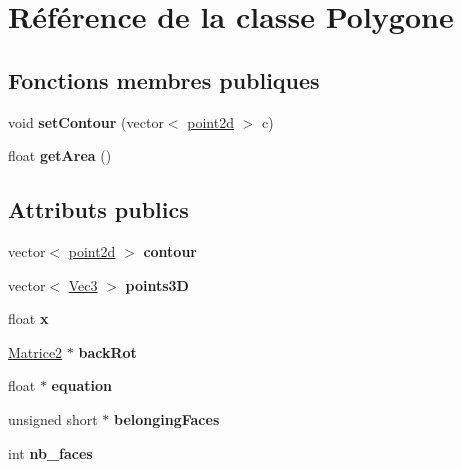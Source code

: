 \hypertarget{class_polygone}{\section{Référence de la classe Polygone}
\label{class_polygone}
}
\subsection*{Fonctions membres publiques}
\begin{DoxyCompactItemize}
\item 
\hypertarget{class_polygone_a3e62cf2566e582fd13f7e8068e81eaf2}{void {\bfseries set\-Contour} (vector$<$ \hyperlink{structpoint2d}{point2d} $>$ c)}\label{class_polygone_a3e62cf2566e582fd13f7e8068e81eaf2}

\item 
\hypertarget{class_polygone_af3ea99499da224811d3abc67e1a35e0a}{float {\bfseries get\-Area} ()}\label{class_polygone_af3ea99499da224811d3abc67e1a35e0a}

\end{DoxyCompactItemize}
\subsection*{Attributs publics}
\begin{DoxyCompactItemize}
\item 
\hypertarget{class_polygone_a7d12fbf6a714dc6a06dc961c1049f483}{vector$<$ \hyperlink{structpoint2d}{point2d} $>$ {\bfseries contour}}\label{class_polygone_a7d12fbf6a714dc6a06dc961c1049f483}

\item 
\hypertarget{class_polygone_ac4737790f5f224a8eccfb5e4ba6b64b6}{vector$<$ \hyperlink{class_vec3}{Vec3} $>$ {\bfseries points3\-D}}\label{class_polygone_ac4737790f5f224a8eccfb5e4ba6b64b6}

\item 
\hypertarget{class_polygone_ae2b5e5c5cb8fc93faa99dfed156b7229}{float {\bfseries x}}\label{class_polygone_ae2b5e5c5cb8fc93faa99dfed156b7229}

\item 
\hypertarget{class_polygone_ae5ac054aa79ec51b752c18125d003cde}{\hyperlink{class_matrice2}{Matrice2} $\ast$ {\bfseries back\-Rot}}\label{class_polygone_ae5ac054aa79ec51b752c18125d003cde}

\item 
\hypertarget{class_polygone_a3d027dfcc164f4ddbefdead646fd5d13}{float $\ast$ {\bfseries equation}}\label{class_polygone_a3d027dfcc164f4ddbefdead646fd5d13}

\item 
\hypertarget{class_polygone_a6c7dfe946ccc3b5c464f0db429bfab31}{unsigned short $\ast$ {\bfseries belonging\-Faces}}\label{class_polygone_a6c7dfe946ccc3b5c464f0db429bfab31}

\item 
\hypertarget{class_polygone_ac8c38cd8237df8512dba0e87cc840273}{int {\bfseries nb\-\_\-faces}}\label{class_polygone_ac8c38cd8237df8512dba0e87cc840273}

\end{DoxyCompactItemize}
